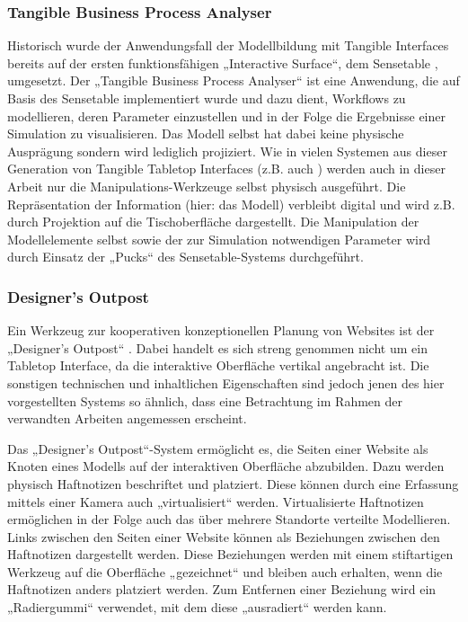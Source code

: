 \subsubsection{Tangible Business Process Analyser} %
\label{ssub:tangible_business_process_analyser}

Historisch wurde der Anwendungsfall der Modellbildung mit Tangible Interfaces bereits auf der ersten funktionsfähigen „Interactive Surface“, dem Sensetable \citep{Patten01}, umgesetzt. Der „Tangible Business Process Analyser“ \citep{Mori04} ist eine Anwendung, die auf Basis des Sensetable implementiert wurde und dazu dient, Workflows zu modellieren, deren Parameter einzustellen und in der Folge die Ergebnisse einer Simulation zu visualisieren. Das Modell selbst hat dabei keine physische Ausprägung sondern wird lediglich projiziert. Wie in vielen Systemen aus dieser Generation von Tangible Tabletop Interfaces (z.B. auch \citep{Fitzmaurice95}) werden auch in dieser Arbeit nur die Manipulations-Werkzeuge selbst physisch ausgeführt. Die Repräsentation der Information (hier: das Modell) verbleibt digital und wird z.B. durch Projektion auf die Tischoberfläche dargestellt. Die Manipulation der Modellelemente selbst sowie der zur Simulation notwendigen Parameter wird durch Einsatz der „Pucks“ des Sensetable-Systems durchgeführt.

\subsubsection{Designer's Outpost} %
\label{ssub:designer_s_outpost}

Ein Werkzeug zur kooperativen konzeptionellen Planung von Websites ist der „Designer's Outpost“ \citep{Klemmer01}. Dabei handelt es sich streng genommen nicht um ein Tabletop Interface, da die interaktive Oberfläche vertikal angebracht ist. Die sonstigen technischen und inhaltlichen Eigenschaften sind jedoch jenen des hier vorgestellten Systems so ähnlich, dass eine Betrachtung im Rahmen der verwandten Arbeiten angemessen erscheint. 

Das „Designer's Outpost“-System ermöglicht es, die Seiten einer Website als Knoten eines Modells auf der interaktiven Oberfläche abzubilden. Dazu werden physisch Haftnotizen beschriftet und platziert. Diese können durch eine Erfassung mittels einer Kamera auch „virtualisiert“ werden. Virtualisierte Haftnotizen ermöglichen in der Folge auch das über mehrere Standorte verteilte Modellieren. Links zwischen den Seiten einer Website können als Beziehungen zwischen den Haftnotizen dargestellt werden. Diese Beziehungen werden mit einem stiftartigen Werkzeug auf die Oberfläche „gezeichnet“ und bleiben auch erhalten, wenn die Haftnotizen anders platziert werden. Zum Entfernen einer Beziehung wird ein „Radiergummi“ verwendet, mit dem diese „ausradiert“ werden kann.

